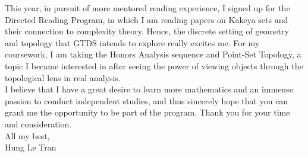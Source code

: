 \documentclass[a4paper, 11pt]{extarticle}
\begin{document}
This year, in pursuit of more mentored reading experience, I signed up for the Directed Reading Program, in which I am reading papers on Kakeya sets and their connection to complexity theory. Hence, the discrete setting of geometry and topology that GTDS intends to explore really excites me. For my coursework, I am taking the Honors Analysis sequence and Point-Set Topology, a topic I became interested in after seeing the power of viewing objects through the topological lens in real analysis.\\

I believe that I have a great desire to learn more mathematics and an immense passion to conduct independent studies, and thus sincerely hope that you can grant me the opportunity to be part of the program. Thank you for your time and consideration.\\

All my best,\\

Hung Le Tran
\end{document}
